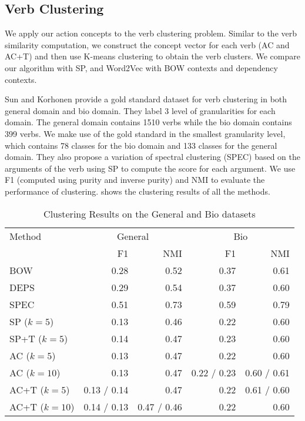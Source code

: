 \subsection{Verb Clustering}
We apply our action concepts to the verb clustering problem.
Similar to the verb similarity computation, we construct the
concept vector for each verb (AC and AC+T) and then use K-means
clustering to obtain the verb clusters. We compare our algorithm
with SP, and Word2Vec with BOW contexts and dependency contexts.

Sun and Korhonen\cite{Sun-Korhonen:2009} provide a gold standard
dataset for verb clustering in both general domain and bio domain.
They label 3 level of granularities for each domain.
The general domain contains 1510 verbs while the bio domain contains
399 verbs. We make use of the gold standard in the smallest granularity level,
which contains 78 classes for the bio domain and 133 classes for the general domain.
They also propose a variation of spectral clustering (SPEC)\cite{SunK09}
based on the arguments of the verb using SP to compute the score for
each argument. We use F1 (computed using purity and inverse purity)
and NMI to evaluate the performance of clustering. 
shows the clustering results of all the methods.

\begin{table*}
\small
\centering
\caption{Clustering Results on the General and Bio datasets}
\begin{tabular}{|l|r|r|r|r|}
\hline
Method & \multicolumn{2}{|c|}{General} &\multicolumn{2}{|c|}{Bio} \\
\cline{2-5}
& F1 & NMI & F1 & NMI \\
\hline
\hline
BOW & 0.28 & 0.52 & 0.37 & 0.61 \\
\hline
DEPS & 0.29 & 0.54 & 0.37 & 0.60\\
\hline
SPEC & 0.51 & 0.73 & 0.59 & 0.79 \\
\hline
SP ($k=5$) & 0.13 & 0.46 & 0.22 & 0.60\\
\hline
SP+T ($k=5$) & 0.14 & 0.47 & 0.23 & 0.60 \\
\hline
AC ($k=5$)& 0.13 & 0.47 & 0.22 & 0.60 \\
\hline
AC ($k=10$)& 0.13 & 0.47 & 0.22 / {\color{red}0.23} & 0.60 / {\color{red}0.61} \\
\hline
AC+T ($k=5$) & 0.13 / {\color{red}0.14} & 0.47 & 0.22 & 0.61 / {\color{red}0.60}\\
\hline
AC+T ($k=10$) & 0.14 / {\color{red}0.13} & 0.47 / {\color{red}0.46} & 0.22 & 0.60 \\
\hline
\end{tabular}
\label{tab:cluster}
\end{table*}

